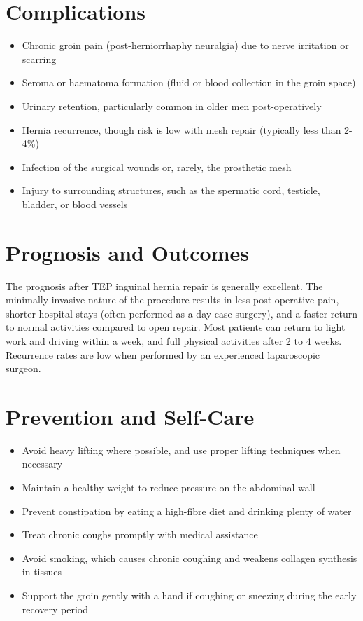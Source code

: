\section*{Complications}
\begin{itemize}
    \item Chronic groin pain (post-herniorrhaphy neuralgia) due to nerve irritation or scarring
    \item Seroma or haematoma formation (fluid or blood collection in the groin space)
    \item Urinary retention, particularly common in older men post-operatively
    \item Hernia recurrence, though risk is low with mesh repair (typically less than 2-4\%)
    \item Infection of the surgical wounds or, rarely, the prosthetic mesh
    \item Injury to surrounding structures, such as the spermatic cord, testicle, bladder, or blood vessels
\end{itemize}

\section*{Prognosis and Outcomes}
The prognosis after TEP inguinal hernia repair is generally excellent. The minimally invasive nature of the procedure results in less post-operative pain, shorter hospital stays (often performed as a day-case surgery), and a faster return to normal activities compared to open repair. Most patients can return to light work and driving within a week, and full physical activities after 2 to 4 weeks. Recurrence rates are low when performed by an experienced laparoscopic surgeon.

\section*{Prevention and Self-Care}
\begin{itemize}
    \item Avoid heavy lifting where possible, and use proper lifting techniques when necessary
    \item Maintain a healthy weight to reduce pressure on the abdominal wall
    \item Prevent constipation by eating a high-fibre diet and drinking plenty of water
    \item Treat chronic coughs promptly with medical assistance
    \item Avoid smoking, which causes chronic coughing and weakens collagen synthesis in tissues
    \item Support the groin gently with a hand if coughing or sneezing during the early recovery period
\end{itemize}

